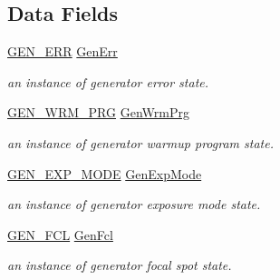 \subsection*{Data Fields}
\begin{DoxyCompactItemize}
\item 
\mbox{\label{struct_g_e_n___s_t_a_t_e_a3bb7e80af26fb5776952863bafb78143}} 
\hyperlink{_instrument_8c_ac7c96d55fc91167731c77ca574178036}{G\+E\+N\+\_\+\+E\+RR} \hyperlink{struct_g_e_n___s_t_a_t_e_a3bb7e80af26fb5776952863bafb78143}{Gen\+Err}
\begin{DoxyCompactList}\small\item\em an instance of generator error state. \end{DoxyCompactList}\item 
\mbox{\label{struct_g_e_n___s_t_a_t_e_a02ba334e408100ad0014afefc2485bbe}} 
\hyperlink{_instrument_8c_a00569347f0e8acf61061534ffff3e6e8}{G\+E\+N\+\_\+\+W\+R\+M\+\_\+\+P\+RG} \hyperlink{struct_g_e_n___s_t_a_t_e_a02ba334e408100ad0014afefc2485bbe}{Gen\+Wrm\+Prg}
\begin{DoxyCompactList}\small\item\em an instance of generator warmup program state. \end{DoxyCompactList}\item 
\mbox{\label{struct_g_e_n___s_t_a_t_e_aeae90d0d64a2bc12a5d84a3641cfb0f0}} 
\hyperlink{_instrument_8c_a0a0a6ad3ca0fd908a8a84e98eccb2bf2}{G\+E\+N\+\_\+\+E\+X\+P\+\_\+\+M\+O\+DE} \hyperlink{struct_g_e_n___s_t_a_t_e_aeae90d0d64a2bc12a5d84a3641cfb0f0}{Gen\+Exp\+Mode}
\begin{DoxyCompactList}\small\item\em an instance of generator exposure mode state. \end{DoxyCompactList}\item 
\mbox{\label{struct_g_e_n___s_t_a_t_e_adc2018c98e814cd74a4fdc3aff85ee65}} 
\hyperlink{_instrument_8c_acc83001a39eb4fd4e0d7731f807de9c2}{G\+E\+N\+\_\+\+F\+CL} \hyperlink{struct_g_e_n___s_t_a_t_e_adc2018c98e814cd74a4fdc3aff85ee65}{Gen\+Fcl}
\begin{DoxyCompactList}\small\item\em an instance of generator focal spot state. \end{DoxyCompactList}\item 

\end{DoxyCompactItemize}
